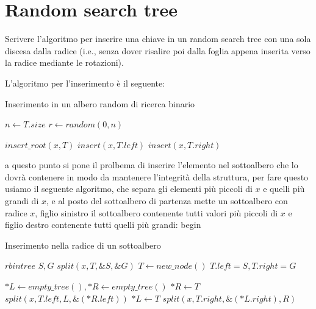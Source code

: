 \chapter{Random search tree}

\begin{problem*}
  Scrivere l'algoritmo per inserire una chiave in un random search tree
  con una sola discesa dalla radice (i.e., senza dover risalire poi dalla
  foglia appena inserita verso la radice mediante le rotazioni).
\end{problem*}

L'algoritmo per l'inserimento è il seguente:

\begin{algorithm}
    \caption{Inserimento in un albero random di ricerca binario}
    \begin{algorithmic}[1]
            \State $n \gets T.size$
            \State $r \gets random(0, n)$

                \State $insert\_root(x, T)$
            \EndIf
                \State $insert(x, T.left)$
            \Else
                \State $insert(x, T.right)$
            \EndIf
        \EndFunction
    \end{algorithmic}
\end{algorithm}

a questo punto si pone il prolbema di inserire l'elemento nel sottoalbero
che lo dovrà contenere in modo da mantenere l'integrità della struttura,
per fare questo usiamo il seguente algoritmo, che separa gli elementi più
piccoli di $x$ e quelli più grandi di $x$, e al posto del sottoalbero di
partenza mette un sottoalbero con radice $x$, figlio sinistro il sottoalbero
contenente tutti valori più piccoli di $x$ e figlio destro contenente tutti
quelli più grandi:
begin
\begin{algorithm}
    \caption{Inserimento nella radice di un sottoalbero}
    \begin{algorithmic}[1]
            \State $rbintree$ $S, G$
            \State $split(x, T, \&S, \&G)$
            \State $T \gets new\_node()$
            \State $T.left = S, T.right = G$
            \State {}
        \EndFunction

                \State $*L \gets empty\_tree(), *R \gets empty\_tree()$
                \State \Return {}
            \EndIf
                \State $*R \gets T$
                \State $split(x, T.left, L, \&(*R.left))$
            \Else
                \State $*L \gets T$
                \State $split(x, T.right, \&(*L.right), R)$
            \EndIf
            \State \Return {}
        \EndFunction
    \end{algorithmic}
\end{algorithm}